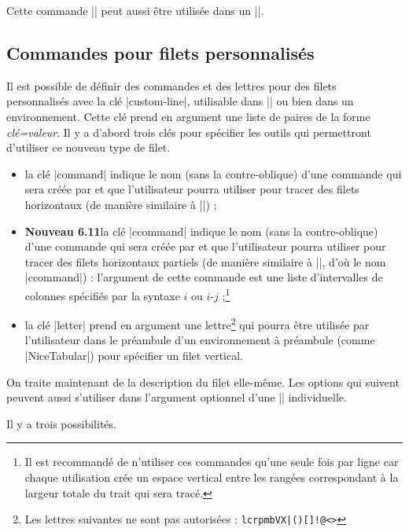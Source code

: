 \documentclass[dvipsnames]{article}%
\begin{document}
\medskip
Cette commande |\diagbox| peut aussi être utilisée dans un |\Block|.



\subsection{Commandes pour filets personnalisés}
\label{custom-line}

Il est possible de définir des commandes et des lettres pour des filets
personnalisés avec la clé |custom-line|, utilisable dans |\NiceMatrixOptions| ou
bien dans un environnement. Cette clé prend en argument une liste de paires de
la forme \textsl{clé=valeur}. Il y a d'abord trois clés pour spécifier les outils
qui permettront d'utiliser ce nouveau type de filet.

\begin{itemize}
\item la clé |command| indique le nom (sans la contre-oblique) d'une commande
qui sera créée par  et que l'utilisateur pourra utiliser pour
tracer des filets horizontaux (de manière similaire à |\hline|) ; 

\item \colorbox{yellow!50}{\textbf{Nouveau 6.11}}\enskip la clé |ccommand|
indique le nom (sans la contre-oblique) d'une commande qui sera créée par
 et que l'utilisateur pourra utiliser pour tracer des filets
horizontaux partiels (de manière similaire à |\cline|, d'où le nom |ccommand|) :
l'argument de cette commande est une liste d'intervalles de colonnes spécifiés
par la syntaxe $i$ ou $i$-$j$ ;\footnote{Il est recommandé de n'utiliser ces
  commandes qu'une seule fois par ligne car chaque utilisation crée un espace
  vertical entre les rangées correspondant à la largeur totale du trait qui sera
  tracé.}

\item la clé |letter| prend en argument une lettre\footnote{Les lettres
  suivantes ne sont pas autorisées : \verb+lcrpmbVX|()[]!@<>+} qui pourra être
utilisée par l'utilisateur dans le préambule d'un environnement à préambule
(comme |{NiceTabular}|) pour spécifier un filet vertical.
\end{itemize}

\bigskip
On traite maintenant de la description du filet elle-même. Les options qui
suivent peuvent aussi s'utiliser dans l'argument optionnel d'une |\Hline|
individuelle. 

Il y a trois possibilités.
\end{document}
